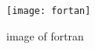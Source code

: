 \documentclass{article}
\begin{document}
\begin{figure}
	\texttt{[image: fortan]}
	\caption{image of fortran}
	\label{fig:fortan}
\end{figure}
\end{document}
